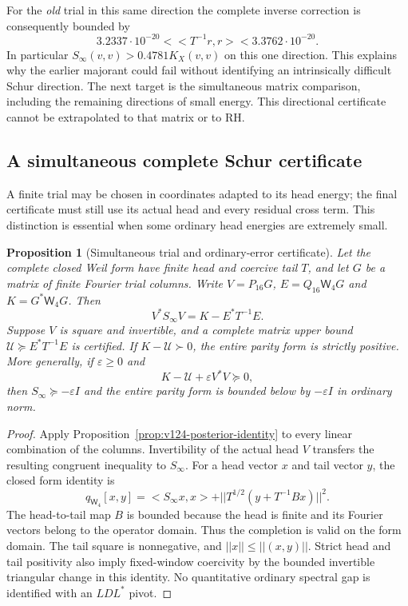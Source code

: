 \documentclass[11pt]{article}
\def\norm#1{||#1||}%
\def\ip#1#2{<#1,#2>}%
\newtheorem{proposition}[theorem]{Proposition}
\theoremstyle{remark}
\newcommand{\norm}[1]{\left\lVert #1\right\rVert}
\newcommand{\ip}[2]{\left\langle #1,#2\right\rangle}
\begin{document}
For the \emph{old} trial in this same direction the complete inverse
correction is consequently bounded by
\[
 3.2337\cdot10^{-20}<\ip{T^{-1}r}{r}
       <3.3762\cdot10^{-20}.
\]
In particular $S_\infty(v,v)>0.4781K_X(v,v)$ on this one
direction. This explains why the earlier majorant could fail
without identifying an intrinsically difficult Schur direction.
The next target is the simultaneous matrix comparison, including
the remaining directions of small energy. This directional
certificate cannot be extrapolated to that matrix or to RH.

\subsection{A simultaneous complete Schur certificate}

A finite trial may be chosen in coordinates adapted to its head energy;
the final certificate must still use its actual head and every residual
cross term.  This distinction is essential when some ordinary head
energies are extremely small.

\begin{proposition}[Simultaneous trial and ordinary-error certificate]
\label{prop:v125-simultaneous}
Let the complete closed Weil form have finite head and coercive tail
$T$, and let $G$ be a matrix of finite Fourier trial columns.  Write
$V=P_{16}G$, $E=Q_{16}\mathsf W_4G$ and $K=G^*\mathsf W_4G$.
Then
\begin{equation}\label{eq:v125-simultaneous}
 V^*S_\infty V=K-E^*T^{-1}E.
\end{equation}
Suppose $V$ is square and invertible, and a complete matrix upper bound
$\mathcal U\succeq E^*T^{-1}E$ is certified.  If
$K-\mathcal U\succ0$, the entire parity form is strictly positive.
More generally, if $\varepsilon\ge0$ and
\[
 K-\mathcal U+\varepsilon V^*V\succeq0,
\]
then $S_\infty\succeq-\varepsilon I$ and the entire parity form is
bounded below by $-\varepsilon I$ in ordinary norm.
\end{proposition}
\begin{proof}
Apply Proposition~\ref{prop:v124-posterior-identity} to every linear
combination of the columns.  Invertibility of the actual head $V$
transfers the resulting congruent inequality to $S_\infty$.
For a head vector $x$ and tail vector $y$, the closed form identity is
\[
 q_{\mathsf W_4}[x,y]
 =\ip{S_\infty x}{x}
   +\norm{T^{1/2}(y+T^{-1}Bx)}^2.
\]
The head-to-tail map $B$ is bounded because the head is finite
and its Fourier vectors belong to the operator domain.  Thus the
completion is valid on the form domain.  The tail square is
nonnegative, and $\norm{x}\le\norm{(x,y)}$.  Strict head and tail
positivity also imply fixed-window coercivity by the bounded
invertible triangular change in this identity.  No quantitative
ordinary spectral gap is identified with an $LDL^*$ pivot.
\end{proof}
\end{document}

